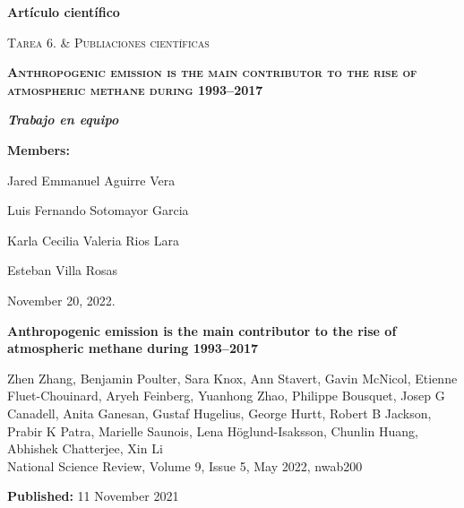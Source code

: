 \documentclass[a4paper,12pt]{article}
\begin{document}
\begin{titlepage}
\centering
{\bfseries\LARGE {Art\'iculo cient\'ifico}\par}
\vspace{1cm}
{\scshape\Large {Tarea 6. & Publiaciones cient\'ificas} \par}
\vspace{3cm}
{\scshape\Huge\textbf {Anthropogenic emission is the main contributor to the rise of atmospheric methane during 1993–2017} \par}
\vspace{3cm}
{\itshape\Large\textbf {Trabajo en equipo}\par}
\vfill
{\Large\textbf {Members:} \par}

\begin{itemize}
\begin{center}
    \item {\Large{Jared Emmanuel Aguirre Vera}}
    \item {\Large{Luis Fernando Sotomayor Garcia}}
    \item {\Large{Karla Cecilia Valeria Rios Lara}} 
    \item {\Large{Esteban Villa Rosas}}
\end{center}
\end{itemize}
\vfill
{\Large November 20, 2022. \par}
\end{titlepage}



\begin{center}

{\Huge{{\textbf{Anthropogenic emission is the main contributor to the rise of atmospheric methane during 1993–2017}}}}

\end{center}

\small{Zhen Zhang, Benjamin Poulter, Sara Knox, Ann Stavert, Gavin McNicol, Etienne Fluet-Chouinard, Aryeh Feinberg, Yuanhong Zhao, Philippe Bousquet, Josep G Canadell, Anita Ganesan, Gustaf Hugelius, George Hurtt, Robert B Jackson, Prabir K Patra, Marielle Saunois, Lena Höglund-Isaksson, Chunlin Huang, Abhishek Chatterjee, Xin Li}\\

\small{National Science Review, Volume 9, Issue 5, May 2022, nwab200}

\small{\textbf{Published:} 11 November 2021}
\end{document}
